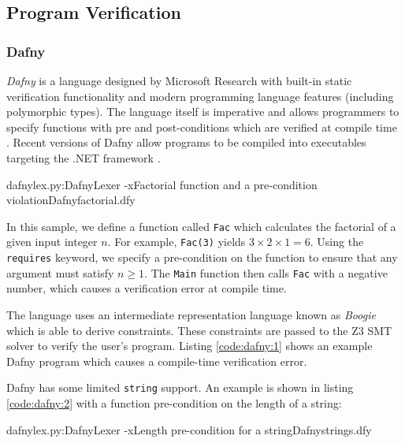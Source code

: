 \documentclass[a4paper,openany,12pt]{book}
\begin{document}
\subsection{Program Verification}

\subsubsection{Dafny}

\emph{Dafny} is a language designed by Microsoft Research with built-in static verification functionality and modern
programming language features (including polymorphic types).
The language itself is imperative and allows programmers to specify functions with pre and post-conditions which are
verified at compile time \citep{dafny2}.
Recent versions of Dafny allow programs to be compiled into executables targeting the .NET framework \citep{dafny}.

\begin{mycodefile}{dafnylex.py:DafnyLexer -x}{\label{code:dafny:1}Factorial function and a pre-condition violation}{Dafny}{factorial.dfy}

    In this sample, we define a function called \texttt{Fac} which calculates the factorial of a given input integer
    $n$.
    For example, \texttt{Fac(3)} yields $3 \times 2 \times 1 = 6$.
    Using the \texttt{requires} keyword, we specify a pre-condition on the function to ensure that any argument must
    satisfy $n \ge 1$.
    The \texttt{Main} function then calls \texttt{Fac} with a negative number, which causes a verification error at
    compile time.

    \vspace{0.5em}
\end{mycodefile}

The language uses an intermediate representation language known as \emph{Boogie} which is able to derive constraints.
These constraints are passed to the Z3 SMT solver to verify the user's program.
Listing \ref{code:dafny:1} shows an example Dafny program which causes a compile-time verification error.

Dafny has some limited \texttt{string} support.
An example is shown in listing \ref{code:dafny:2} with a function pre-condition on the length of a string:

\begin{mycodefile}{dafnylex.py:DafnyLexer -x}{\label{code:dafny:2}Length pre-condition for a string}{Dafny}{strings.dfy}
\end{mycodefile}
\end{document}
